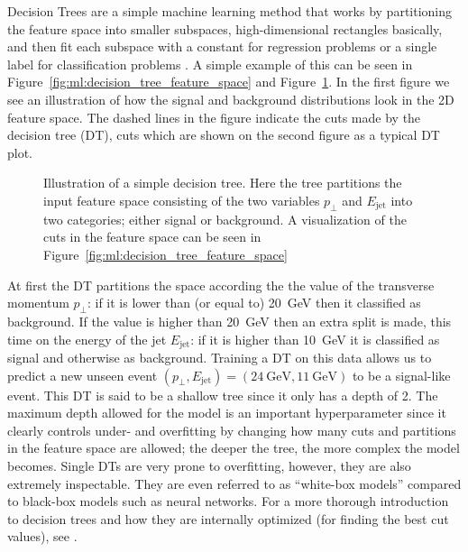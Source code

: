 \documentclass[a4paper, twoside, nobib]{tufte-book}
\newcommand{\q}[1]{``#1''}
\begin{document}
Decision Trees are a simple machine learning method that works by partitioning the feature space into smaller subspaces, high-dimensional rectangles basically, and then fit each subspace with a constant for regression problems or a single label for classification problems \citep{hastieElementsStatisticalLearning2009}. A simple example of this can be seen in Figure~\ref{fig:ml:decision_tree_feature_space} and Figure~\ref{fig:ml:decision_tree}. In the first figure we see an illustration of how the signal and background distributions look in the 2D feature space. The dashed lines in the figure indicate the cuts made by the decision tree (DT), cuts which are shown on the second figure as a typical DT plot. 
\begin{figure}
  \centering
  \caption[Decision Tree Illustration]{
    Illustration of a simple decision tree. Here the tree partitions the input feature space consisting of the two variables $p_\perp$ and $E_\mathrm{jet}$ into two categories; either signal or background. A visualization of the cuts in the feature space can be seen in Figure~\ref{fig:ml:decision_tree_feature_space}
  }
  \label{fig:ml:decision_tree}
\end{figure}
At first the DT partitions the space according the the value of the transverse momentum $p_\perp$: if it is lower than (or equal to) \SI{20}{\GeV} then it classified as background. If the value is higher than \SI{20}{\GeV} then an extra split is made, this time on the energy of the jet $E_\mathrm{jet}$: if it is higher than \SI{10}{\GeV} it is classified as signal and otherwise as background. Training a DT on this data allows us to predict a new unseen event $(p_\perp, E_\mathrm{jet}) = (\SI{24}{\GeV},\SI{11}{\GeV})$ to be a signal-like event. This DT is said to be a shallow tree since it only has a depth of \num{2}. The maximum depth allowed for the model is an important hyperparameter since it clearly controls under- and overfitting by changing how many cuts and partitions in the feature space are allowed; the deeper the tree, the more complex the model becomes. Single DTs are very prone to overfitting, however, they are also extremely inspectable. They are even referred to as \q{white-box models} compared to black-box models such as neural networks. For a more thorough introduction to decision trees and how they are internally optimized (for finding the best cut values), see \citet{hastieElementsStatisticalLearning2009}. 
\end{document}
